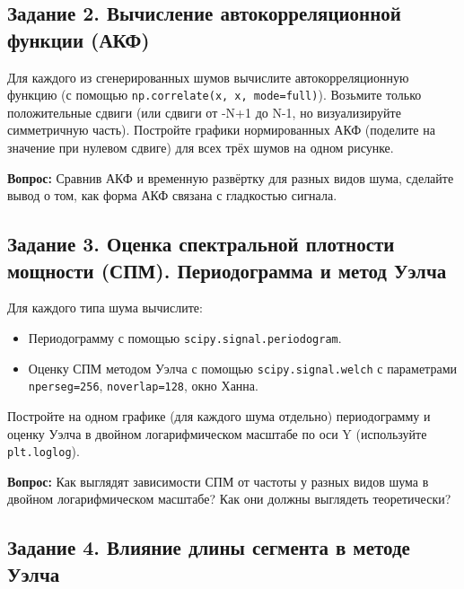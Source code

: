 \documentclass[12pt,a4paper,openany]{book}
\providecommand{\tightlist}{\setlength{\itemsep}{0pt}\setlength{\parskip}{0pt}}
\begin{document}
\subsection*{Задание 2. Вычисление автокорреляционной функции (АКФ)}

Для каждого из сгенерированных шумов вычислите автокорреляционную функцию (с помощью \texttt{np.\allowbreak{}correlate(\allowbreak{}x,\allowbreak{}\ x,\allowbreak{}\ mode=\allowbreak{}\textquotesingle{}\allowbreak{}full\textquotesingle{}\allowbreak{})}). Возьмите только положительные сдвиги (или сдвиги от -N+1 до N-1, но визуализируйте симметричную часть). Постройте графики нормированных АКФ (поделите на значение при нулевом сдвиге) для всех трёх шумов на одном рисунке.

\textbf{Вопрос:} Сравнив АКФ и временную развёртку для разных видов шума, сделайте вывод о том, как форма АКФ связана с гладкостью сигнала.

\subsection*{Задание 3. Оценка спектральной плотности мощности (СПМ). Периодограмма и метод Уэлча}

Для каждого типа шума вычислите:

\begin{itemize}
\tightlist
\item
  Периодограмму с помощью \texttt{scipy.\allowbreak{}signal.\allowbreak{}periodogram}.
\item
  Оценку СПМ методом Уэлча с помощью \texttt{scipy.\allowbreak{}signal.\allowbreak{}welch} с параметрами \texttt{nperseg=\allowbreak{}256}, \texttt{noverlap=\allowbreak{}128}, окно Ханна.
\end{itemize}

Постройте на одном графике (для каждого шума отдельно) периодограмму и оценку Уэлча в двойном логарифмическом масштабе по оси Y (используйте \texttt{plt.\allowbreak{}loglog}).

\textbf{Вопрос:} Как выглядят зависимости СПМ от частоты у разных видов шума в двойном логарифмическом масштабе? Как они должны выглядеть теоретически?

\subsection*{Задание 4. Влияние длины сегмента в методе Уэлча}
\end{document}
